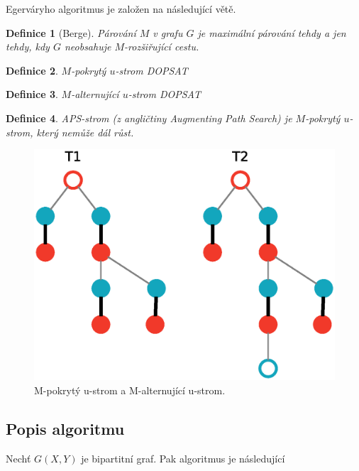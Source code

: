 \documentclass[a4paper, 11pt, titlepage, final]{article}[3. prosinec 2011]
\newtheorem{Definice}{Definice}
\begin{document}
Egerváryho algoritmus je založen na následující větě.

\begin{Definice}[Berge]
Párování $M$ v grafu $G$ je maximální párování tehdy a jen tehdy, kdy $G$ neobsahuje $M$-rozšiřující cestu. 
\end{Definice}

\begin{Definice}
\textit{$M$-pokrytý $u$-strom} DOPSAT
\end{Definice}


\begin{Definice}
\textit{$M$-alternující $u$-strom} DOPSAT
\end{Definice}

\begin{Definice}
\textit{APS-strom} (z angličtiny Augmenting Path Search) je $M$-pokrytý $u$-strom, který nemůže dál růst.
\end{Definice}

\begin{figure}[ht]
  \centering
  \includegraphics[scale=0.5]{img/trees.eps}
  \caption{M-pokrytý u-strom a M-alternující u-strom.}
  \label{imgTrees}
\end{figure}


\subsection{Popis algoritmu}

Nechť $G(X,Y)$ je bipartitní graf. Pak algoritmus je následující
\end{document}
